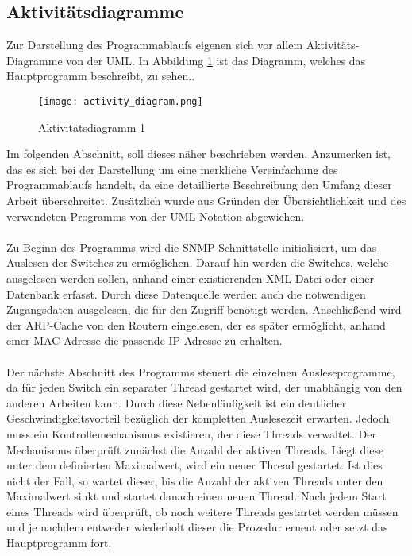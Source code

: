 \subsection{Aktivitätsdiagramme}
\label{subsec:acitvitydiagrams}

Zur Darstellung des Programmablaufs eigenen sich vor allem Aktivitäts-Diagramme von der UML.
In Abbildung \ref{fig:activitydiagram1} ist das Diagramm, welches das Hauptprogramm beschreibt, zu sehen..\\

\begin{figure}[H]
\centering
\texttt{[image: activity\_diagram.png]}
\caption{Aktivitätsdiagramm 1}
\label{fig:activitydiagram1}
\end{figure}

Im folgenden Abschnitt, soll dieses näher beschrieben werden.
Anzumerken ist, das es sich bei der Darstellung um eine merkliche Vereinfachung des Programmablaufs handelt, da eine detaillierte Beschreibung den Umfang dieser Arbeit überschreitet. Zusätzlich wurde aus Gründen der Übersichtlichkeit und des verwendeten Programms von der UML-Notation abgewichen. \\\\
Zu Beginn des Programms wird die SNMP-Schnittstelle initialisiert, um das Auslesen der Switches zu ermöglichen. Darauf hin werden die Switches, welche ausgelesen werden sollen, anhand einer existierenden XML-Datei oder einer Datenbank erfasst. Durch diese Datenquelle werden auch die notwendigen Zugangsdaten ausgelesen, die für den Zugriff benötigt werden.
Anschließend wird der ARP-Cache von den Routern eingelesen, der es später ermöglicht, anhand einer MAC-Adresse die passende IP-Adresse zu erhalten.\\\\
Der nächste Abschnitt des Programms steuert die einzelnen Ausleseprogramme, da für jeden Switch ein separater Thread gestartet wird, der unabhängig von den anderen Arbeiten kann. Durch diese Nebenläufigkeit ist ein deutlicher Geschwindigkeitsvorteil bezüglich der kompletten Auslesezeit erwarten. Jedoch muss ein Kontrollemechanismus existieren, der diese Threads verwaltet. Der Mechanismus überprüft zunächst die Anzahl der aktiven Threads. Liegt diese unter dem definierten Maximalwert, wird ein neuer Thread gestartet. Ist dies nicht der Fall, so wartet dieser, bis die Anzahl der aktiven Threads unter den Maximalwert sinkt und startet danach einen neuen Thread. Nach jedem Start eines Threads wird überprüft, ob noch weitere Threads gestartet werden müssen und je nachdem entweder wiederholt dieser die Prozedur erneut oder setzt das Hauptprogramm fort.\\\\
